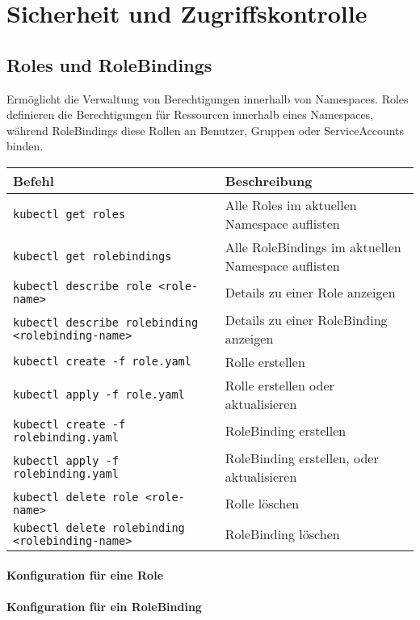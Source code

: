 \chapter{Sicherheit und Zugriffskontrolle}

\section{Roles und RoleBindings}
Ermöglicht die Verwaltung von Berechtigungen innerhalb von Namespaces. Roles definieren die Berechtigungen für Ressourcen innerhalb eines Namespaces, während RoleBindings diese Rollen an Benutzer, Gruppen oder ServiceAccounts binden.\\

\noindent
\begin{tabularx}{\textwidth}{|X|X|}
\hline
\textbf{Befehl} & \textbf{Beschreibung} \\
\hline
\texttt{kubectl get roles} & Alle Roles im aktuellen Namespace auflisten \\
\texttt{kubectl get rolebindings} & Alle RoleBindings im aktuellen Namespace auflisten \\
\texttt{kubectl describe role <role-name>} & Details zu einer Role anzeigen \\
\texttt{kubectl describe rolebinding <rolebinding-name>} & Details zu einer RoleBinding anzeigen \\
\texttt{kubectl create -f role.yaml} & Rolle erstellen\\
\texttt{kubectl apply -f role.yaml} & Rolle erstellen oder aktualisieren\\
\texttt{kubectl create -f rolebinding.yaml} & RoleBinding erstellen\\
\texttt{kubectl apply -f rolebinding.yaml} & RoleBinding erstellen, oder aktualisieren\\
\texttt{kubectl delete role <role-name>} & Rolle löschen \\
\texttt{kubectl delete rolebinding <rolebinding-name>} & RoleBinding löschen \\
\hline
\end{tabularx}

\subsubsection{Konfiguration für eine Role}


\subsubsection{Konfiguration für ein RoleBinding}



